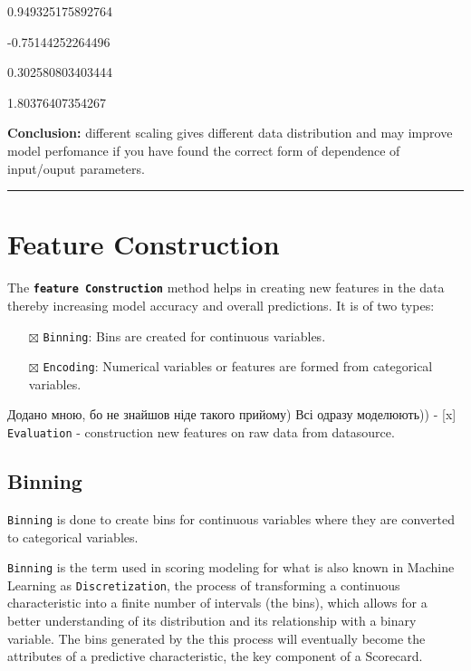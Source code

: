 \documentclass[
  letterpaper,
  DIV=11,
  numbers=noendperiod]{scrreprt}
\providecommand{\tightlist}{%
  \setlength{\itemsep}{0pt}\setlength{\parskip}{0pt}}\usepackage{longtable,booktabs,array}
\begin{document}
0.949325175892764

-0.75144252264496

0.302580803403444

1.80376407354267

\textbf{Conclusion:} different scaling gives different data distribution
and may improve model perfomance if you have found the correct form of
dependence of input/ouput parameters.

\begin{center}\rule{0.5\linewidth}{0.5pt}\end{center}

\section{Feature Construction}\label{feature-construction}

The \textbf{\texttt{feature\ Construction}} method helps in creating new
features in the data thereby increasing model accuracy and overall
predictions. It is of two types:

\begin{itemize}
\tightlist
\item[$\boxtimes$]
  \texttt{Binning}: Bins are created for continuous variables.
\item[$\boxtimes$]
  \texttt{Encoding}: Numerical variables or features are formed from
  categorical variables.
\end{itemize}

Додано мною, бо не знайшов ніде такого прийому) Всі одразу моделюють)) -
{[}x{]} \texttt{Evaluation} - construction new features on raw data from
datasource.

\subsection{Binning}\label{binning}

\texttt{Binning} is done to create bins for continuous variables where
they are converted to categorical variables.

\texttt{Binning} is the term used in scoring modeling for what is also
known in Machine Learning as \texttt{Discretization}, the process of
transforming a continuous characteristic into a finite number of
intervals (the bins), which allows for a better understanding of its
distribution and its relationship with a binary variable. The bins
generated by the this process will eventually become the attributes of a
predictive characteristic, the key component of a Scorecard.
\end{document}
